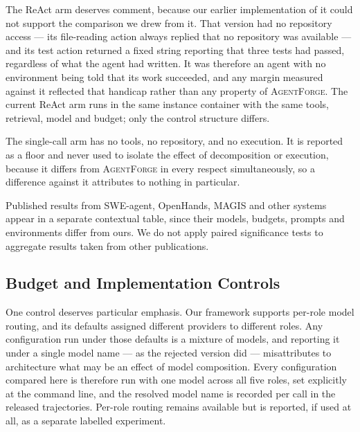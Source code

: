 \documentclass[journal]{IEEEtran}
\newcommand{\agentforge}{\textsc{AgentForge}}
\begin{document}
The ReAct arm deserves comment, because our earlier implementation of it could not support the comparison we drew from it. That version had no repository access — its file-reading action always replied that no repository was available — and its test action returned a fixed string reporting that three tests had passed, regardless of what the agent had written. It was therefore an agent with no environment being told that its work succeeded, and any margin measured against it reflected that handicap rather than any property of \agentforge{}. The current ReAct arm runs in the same instance container with the same tools, retrieval, model and budget; only the control structure differs.

The single-call arm has no tools, no repository, and no execution. It is reported as a floor and never used to isolate the effect of decomposition or execution, because it differs from \agentforge{} in every respect simultaneously, so a difference against it attributes to nothing in particular.

Published results from SWE-agent, OpenHands, MAGIS and other systems appear in a separate contextual table, since their models, budgets, prompts and environments differ from ours. We do not apply paired significance tests to aggregate results taken from other publications.

\subsection{Budget and Implementation Controls}

One control deserves particular emphasis. Our framework supports per-role model routing, and its defaults assigned different providers to different roles. Any configuration run under those defaults is a mixture of models, and reporting it under a single model name — as the rejected version did — misattributes to architecture what may be an effect of model composition. Every configuration compared here is therefore run with one model across all five roles, set explicitly at the command line, and the resolved model name is recorded per call in the released trajectories. Per-role routing remains available but is reported, if used at all, as a separate labelled experiment.
\end{document}
